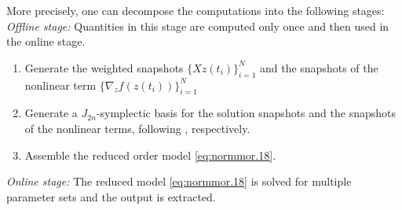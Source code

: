 More precisely, one can decompose the computations into the following stages:
\emph{Offline stage:} Quantities in this stage are computed only once and then used in the online stage.
\begin{enumerate}
\item Generate the weighted snapshots $\{ X z(t_i) \}_{i=1}^N$ and the snapshots of the nonlinear term $\{\nabla_zf(z(t_i))\}_{i=1}^N$
\item Generate a $J_{2n}$-symplectic basis for the solution snapshots and the snapshots of the nonlinear terms, following , respectively.
\item Assemble the reduced order model \cref{eq:normmor.18}.
\end{enumerate}
\emph{Online stage:} The reduced model \cref{eq:normmor.18} is solved for multiple parameter sets and the output is extracted.
